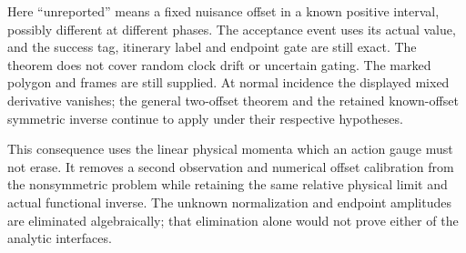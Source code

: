 Here ``unreported'' means a fixed nuisance offset in a known positive
interval, possibly different at different phases.  The acceptance event
uses its actual value, and the success tag, itinerary label and endpoint
gate are still exact.  The theorem does not cover random clock drift or
uncertain gating.  The marked polygon and frames are still supplied.
At normal incidence the displayed mixed derivative vanishes; the
general two-offset theorem and the retained known-offset symmetric
inverse continue to apply under their respective hypotheses.

This consequence uses the linear physical momenta which an action gauge
must not erase.  It removes a second observation and numerical offset
calibration from the nonsymmetric problem while retaining the same
relative physical limit and actual functional inverse.  The unknown
normalization and endpoint amplitudes are eliminated algebraically;
that elimination alone would not prove either of the analytic interfaces.

